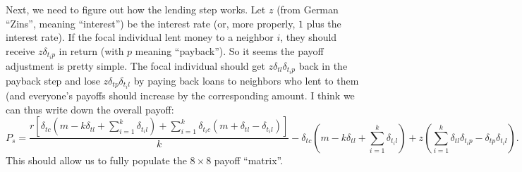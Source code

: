 \documentclass[14pt, a4paper, justified]{article}
\begin{document}
Next, we need to figure out how the lending step works.
Let $z$ (from German ``Zins'', meaning ``interest'') be the interest rate (or, more properly, $1$ plus the interest rate).
If the focal individual lent money to a neighbor $i$, they should receive $z \delta_{t_i p}$ in return (with $p$ meaning ``payback'').
So it seems the payoff adjustment is pretty simple.
The focal individual should get $z\delta_{tl} \delta_{t_i p}$ back in the payback step and lose $z \delta_{tp} \delta_{t_i l}$ by paying back loans to neighbors who lent to them (and everyone's payoffs should increase by the corresponding amount.
I think we can thus write down the overall payoff:
\begin{equation}
    P_s = \frac{r[\delta_{tc}(m - k\delta_{tl} + \sum_{i=1}^k \delta_{t_i l}) + \sum_{i=1}^k \delta_{t_i c} (m + \delta_{tl} - \delta_{t_i l})]}{k} - \delta_{tc}(m - k\delta_{tl} + \sum_{i=1}^k \delta_{t_i l}) + z(\sum_{i=1}^k \delta_{tl} \delta_{t_i p} - \delta_{tp} \delta_{t_i l}).
\end{equation}
This should allow us to fully populate the $8 \times 8$ payoff ``matrix''.



\end{document}
